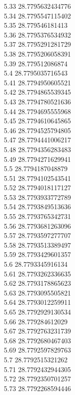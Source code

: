 {5.33	28.7795632434776\\
5.34	28.7795547115402\\
5.35	28.779546181413\\
5.36	28.7795376534932\\
5.37	28.7795291281729\\
5.38	28.7795206058391\\
5.39	28.779512086874\\
5.4	28.7795035716543\\
5.41	28.7794950605521\\
5.42	28.7794865539345\\
5.43	28.7794780521636\\
5.44	28.7794695555968\\
5.45	28.7794610645865\\
5.46	28.7794525794805\\
5.47	28.7794441006217\\
5.48	28.7794356283483\\
5.49	28.7794271629941\\
5.5	28.7794187048879\\
5.51	28.7794102543541\\
5.52	28.7794018117127\\
5.53	28.7793933772789\\
5.54	28.7793849513636\\
5.55	28.7793765342731\\
5.56	28.7793681263096\\
5.57	28.7793597277707\\
5.58	28.7793513389497\\
5.59	28.7793429601357\\
5.6	28.7793345916134\\
5.61	28.7793262336635\\
5.62	28.7793178865623\\
5.63	28.7793095505821\\
5.64	28.7793012259911\\
5.65	28.7792929130534\\
5.66	28.779284612029\\
5.67	28.7792763231739\\
5.68	28.7792680467403\\
5.69	28.7792597829763\\
5.7	28.7792515321262\\
5.71	28.7792432944305\\
5.72	28.7792350701257\\
5.73	28.7792268594446\\
}
